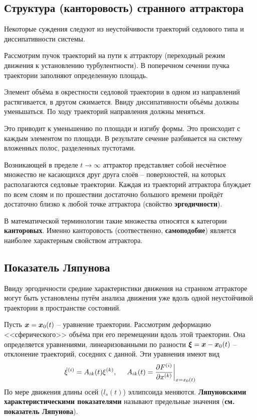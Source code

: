 \subsection{Структура (канторовость) странного аттрактора}

Некоторые суждения следуют из неустойчивости траекторий седлового типа и диссипативности системы.

Рассмотрим пучок траекторий на пути к аттрактору (переходный режим движения к установлению турбулентности). В поперечном сечении пучка траектории заполняют определенную площадь. 

Элемент объёма в окрестности седловой траектории в одном из направлений растягивается, в другом сжимается. Ввиду диссипативности объёмы должны уменьшаться. По ходу траекторий направления должны меняться. 

Это приводит к уменьшению по площади и изгибу формы. Это происходит с каждым элементом по площади. В результате сечение разбивается на систему вложенных полос, разделенных пустотами.

Возникающей в пределе $t \to \infty$ аттрактор представляет собой несчётное множество не касающихся друг друга слоёв --  поверхностей, на которых располагаются седловые траектории. Каждая из траекторий аттрактора блуждает по всем слоям и по прошествии достаточно большого времени пройдёт достаточно близко к любой точке аттрактора (свойство \textbf{эргодичности}). 

В математической терминологии такие множества относятся к категории \textbf{канторовых}. Именно канторовость (соотвественно, \textbf{самоподобие}) является наиболее характерным свойством аттрактора. 

\subsection{Показатель Ляпунова}

Ввиду эргодичности средние характеристики движения на странном аттракторе могут быть установлены путём анализа движения уже вдоль одной неустойчивой траектории в пространстве состояний. 

Пусть $\mbox{\boldmath $x$} = \mbox{\boldmath $x$}_0 (t)$ -- уравнение траектории. Рассмотрим деформацию <<сферического>> объёма при его перемещении вдоль этой траектории. Она определяется уравнениями, линеаризованными по разности $\mbox{\boldmath $\xi$} = \mbox{\boldmath $x$} - \mbox{\boldmath $x$}_0 (t)$ -- отклонение траекторий, соседних с данной. Эти уравнения имеют вид
\begin{equation}
    \dot \xi^{(i)} = A_{ik} (t) \xi^{(k)}, \hspace{0.5cm} A_{ik} (t) = \frac{\partial F^{(i)}}{\partial x^{(k)}} \bigg|_{x=x_0(t)}
\end{equation}
По мере движения длины осей ($l_s(t)$) эллипсоида меняются. \textbf{Ляпуновскими характеристическими показателями} называют предельные значения (\textbf{см. показатель Ляпунова}).